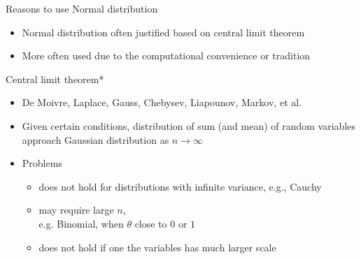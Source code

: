 \documentclass[english,t]{beamer}
\begin{document}
\begin{frame}{Reasons to use Normal distribution}

  \begin{itemize}
  \item Normal distribution often justified based on central limit theorem
  \item More often used due to the computational convenience or tradition
  \end{itemize}

\end{frame}


\begin{frame}{Central limit theorem*}

  \begin{itemize}
  \item De Moivre, Laplace, Gauss, Chebysev, Liapounov, Markov, et al.
  \item Given certain conditions, distribution of sum (and mean) of
    random variables approach Gaussian distribution as
    $n \rightarrow \infty$
  \item Problems
    \begin{itemize}
    \item does not hold for distributions with infinite variance,
      e.g., Cauchy
    \item<2-> may require large $n$,\\ e.g.
      Binomial, when $\theta$ close to $0$ or $1$
    \item<3-> does not hold if one the variables has much larger scale
    \end{itemize}
  \end{itemize}

\end{frame}


\end{document}
